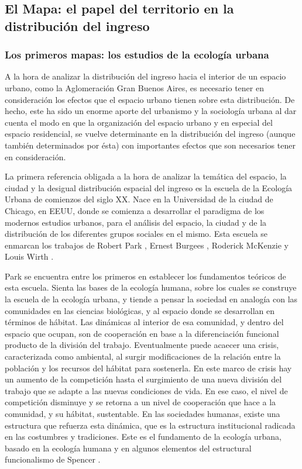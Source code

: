 	\subsection{El Mapa: el papel del territorio en la distribución del ingreso}
	
	\subsubsection{Los primeros mapas: los estudios de la ecología urbana}

A la hora de analizar la distribución del ingreso hacia el interior de un espacio urbano, como la Aglomeración Gran Buenos Aires, es necesario tener en consideración los efectos que el espacio urbano tienen sobre esta distribución. De hecho, este ha sido un enorme aporte del urbanismo y la sociología urbana\cite{park,burgess1928,mckenzie,wirth,lefebvre,harvey,castells} al dar cuenta el modo en que la organización del espacio urbano y en especial del espacio residencial, se vuelve determinante en la distribución del ingreso (aunque también determinados por ésta) con importantes efectos que son necesarios tener en consideración. 

La primera referencia obligada a la hora de analizar la temática del espacio, la ciudad y la desigual distribución espacial del ingreso es la escuela de la Ecología Urbana de comienzos del siglo XX. Nace en la Universidad de la ciudad de Chicago, en EEUU, donde se comienza a desarrollar el paradigma de los modernos estudios urbanos, para el análisis del espacio, la ciudad y de la distribución de los diferentes grupos sociales en el mismo. Esta escuela se enmarcan los trabajos de Robert Park \citeyear{park}, Ernest Burgees \citeyear{burgess1928}, Roderick McKenzie \citeyear{mckenzie} y Louis Wirth \citeyear{wirth}.

Park se encuentra entre los primeros en establecer los fundamentos teóricos de esta escuela. Sienta las bases de la ecología humana, sobre los cuales se construye la escuela de la ecología urbana, y tiende a pensar la sociedad en analogía con las comunidades en las ciencias biológicas, y al espacio donde se desarrollan en términos de hábitat. Las dinámicas al interior de esa comunidad, y dentro del espacio que ocupan, son de cooperación en base a la diferenciación funcional producto de la división del trabajo. Eventualmente puede acaecer una crisis, caracterizada como ambiental, al surgir modificaciones de la relación entre la población y los recursos del hábitat para sostenerla. En este marco de crisis hay un aumento de la competición hasta el surgimiento de una nueva división del trabajo que se adapte a las nuevas condiciones de vida. En ese caso, el nivel de competición disminuye y se retorna a un nivel de cooperación que hace a la comunidad, y su hábitat, sustentable. En las sociedades humanas, existe una estructura que refuerza esta dinámica, que es la estructura institucional radicada en las costumbres y tradiciones. Este es el fundamento de la ecología urbana, basado en la ecología humana y en algunos elementos del estructural funcionalismo de Spencer \cite{park,betin,gottdiener}.

